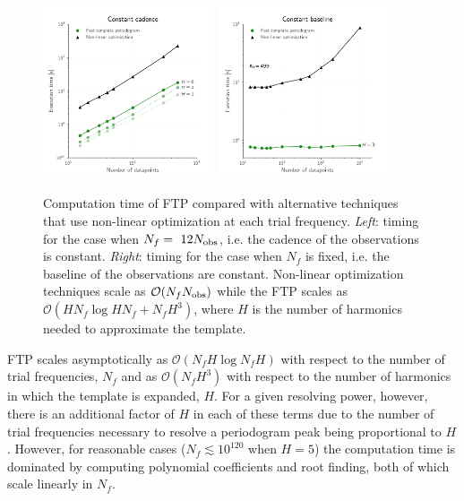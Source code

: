 \documentclass[apj]{emulateapj}
\newcommand{\bigO}{\mathcal{O}}
\begin{document}
\begin{figure}
    \centering
    \includegraphics[width=0.45\textwidth]{timing_vs_ndata.pdf}
    \includegraphics[width=0.45\textwidth]{timing_vs_ndata_const_freq.pdf}
    \caption{\label{fig:timingndata} Computation time of FTP compared with alternative techniques
             that use non-linear optimization at each trial frequency. \emph{Left}: timing for the
             case when $N_f = ~12 N_{\rm obs}$, i.e. the cadence of the observations is constant.
             \emph{Right}: timing for the case when $N_f$ is fixed, i.e. the baseline of the observations
             are constant. Non-linear optimization techniques scale as $\bigO(N_f N_{\rm obs})$ while
             the FTP scales as $\bigO(HN_f\log HN_f + N_fH^3)$, where $H$ is the number of harmonics
             needed to approximate the template.}

\end{figure}

FTP scales asymptotically as $\bigO(N_fH\log N_fH)$ with respect to the number of trial frequencies,
$N_f$ and as $\bigO(N_fH^3)$ with respect to the number of harmonics in which the template is expanded, $H$.
For a given resolving power, however, there is an additional factor of $H$ in each of these terms due to the
number of trial frequencies necessary to resolve a periodogram peak being proportional to $H$.
However, for reasonable cases ($N_f \lesssim 10^{120}$ when $H=5$) the computation time is dominated by
computing polynomial coefficients and root finding, both of which scale linearly in $N_f$.
\end{document}
